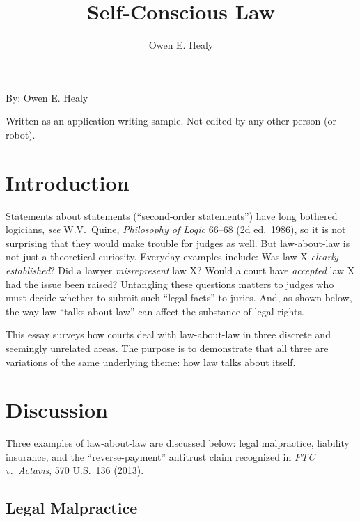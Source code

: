 \documentclass[
  12pt,
  letterpaper,
]{scrartcl}
\title{Self-Conscious Law}
\author{Owen E. Healy}
\begin{document}
\begin{center}\end{center}
  
\vspace{12pt}\noindent\begin{minipage}{4in}
  \setlength{\parskip}{6pt}
  
  \noindent By: Owen E. Healy

  \noindent Written as an application writing sample. Not edited by any other person (or robot).
\end{minipage}


\vspace{12pt}\section{Introduction}

Statements about statements (``second-order statements'') have long bothered
logicians, \textit{see} W.V.~Quine, \textit{Philosophy of Logic} 66--68 (2d
ed.~1986), so it is not surprising that they would make trouble for judges as
well. But law-about-law is not just a theoretical curiosity. Everyday examples
include: Was law X \emph{clearly established}? Did a lawyer \emph{misrepresent}
law X? Would a court have \emph{accepted} law X had the issue been raised?
Untangling these questions matters to judges who must decide whether to submit
such ``legal facts'' to juries. And, as shown below, the way law ``talks about
law'' can affect the substance of legal rights.

This essay surveys how courts deal with law-about-law in three discrete and
seemingly unrelated areas. The purpose is to demonstrate that all three are
variations of the same underlying theme: how law talks about itself.


\section{Discussion}

Three examples of law-about-law are discussed below: legal malpractice,
liability insurance, and the ``reverse-payment'' antitrust claim recognized
in \textit{FTC v.~Actavis}, 570 U.S.~136 (2013).


\subsection{Legal Malpractice}
\end{document}
